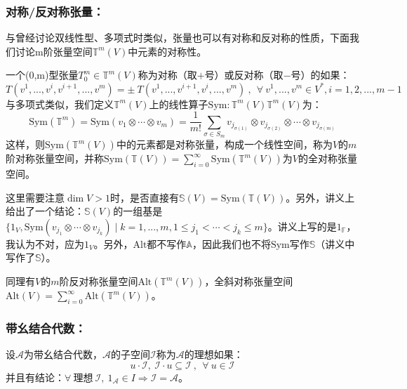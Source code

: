 \documentclass[zihao=5,UTF8]{report}
\def\F{\mathbb{F}}
\def\T{\mathbb{T}}
\def\S{\mathbb{S}}
\def\A{\mathbb{A}}
\def\I{\mathscr{I}}
\theoremstyle{mystyle} %
\begin{document}
\subsubsection{对称/反对称张量：}
与曾经讨论双线性型、多项式时类似，张量也可以有对称和反对称的性质，下面我们讨论m阶张量空间$\T^m(V)$中元素的对称性。

一个(0,m)型张量$T_0^m \in \T^m(V)$称为对称（取$+$号）或反对称（取$-$号）的如果：
\begin{equation*}
    T(v^1,...,v^i,v^{i+1},...,v^m) = \pm\  T(v^1,...,v^{i+1},v^{i},...,v^m) \ ,\ \ \forall\ v^1,...,v^m \in V^*, i=1,2,...,m-1
\end{equation*}
与多项式类似，我们定义$\T^m(V)$上的线性算子$\text{Sym}: \T^m(V) \T^m(V)$为：
\begin{equation*}
    \text{Sym}(\T^m) = \text{Sym}(v_1 \otimes \cdots \otimes v_m) = \frac{1}{m!}\sum_{\sigma\in S_m}v_{j_{\sigma(1)}} \otimes v_{j_{\sigma(2)}} \otimes\cdots \otimes v_{j_{\sigma(m)}}
\end{equation*}
这样，则$\text{Sym}(\T^m(V))$中的元素都是对称张量，构成一个线性空间，称为$V$的$m$阶对称张量空间，并称$\text{Sym}(\T(V))= \sum_{i=0}^{\infty}\text{Sym}(\T^m(V))$为$V$的全对称张量空间。

这里需要注意$\dim V>1$时，是否直接有$\S(V) = \text{Sym}(\T(V))$。另外，讲义上给出了一个结论：$\S(V)$的一组基是$\{1_{V}, \text{Sym}(v_{j_1} \otimes \cdots \otimes v_{j_k})\mid k = 1,...,m, 1 \le j_1 < \cdots < j_k \le m\}$。{\color{red}讲义上写的是$1_{\F}$，我认为不对，应为$1_V$。另外，$\text{Alt}$都不写作$\A$，因此我们也不将$\text{Sym}$写作$\S$（讲义中写作了$\S$）。}

同理有$V$的$m$阶反对称张量空间$\text{Alt}(\T^m(V))$，全斜对称张量空间$\text{Alt}(V) =  \sum_{i=0}^{\infty}\text{Alt}(\T^m(V))$。


\subsubsection{带幺结合代数：}
设$\mathscr{A}$为带幺结合代数，$\mathscr{A}$的子空间$\I$称为$\mathscr{A}$的理想如果：
\begin{equation*}
    u\cdot \I,\ \I\cdot u \subseteq \I\ ,\ \ \forall\ u\in \I
\end{equation*}
并且有结论：$\forall\ \text{理想}\ \I,\ 1_{\mathscr{A}} \in I \Longrightarrow \I = \mathscr{A}$。




\nocite{*}

\thispagestyle{fancy} 
\end{document}
